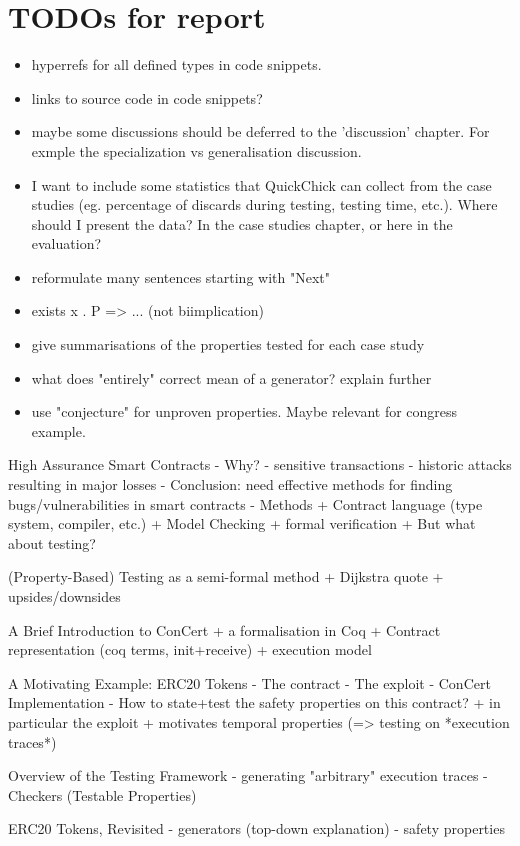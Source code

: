 \documentclass{article}
\begin{document}
\section{TODOs for report}
\begin{itemize}
    \item hyperrefs for all defined types in code snippets.
    \item links to source code in code snippets?
    \item maybe some discussions should be deferred to the 'discussion' chapter. For exmple the specialization vs generalisation discussion.
    \item I want to include some statistics that QuickChick can collect from the case studies (eg. percentage of discards during testing, testing time, etc.). Where should I present the data? In the case studies chapter, or here in the evaluation?
    \item reformulate many sentences starting with "Next"
    \item exists x . P => ... (not biimplication)
    \item give summarisations of the properties tested for each case study
    \item what does "entirely" correct mean of a generator? explain further
    \item use "conjecture" for unproven properties. Maybe relevant for congress example.
\end{itemize}

High Assurance Smart Contracts
- Why?
  - sensitive transactions
  - historic attacks resulting in major losses
  - Conclusion: need effective methods for finding bugs/vulnerabilities in smart contracts
- Methods
  + Contract language (type system, compiler, etc.)
  + Model Checking
  + formal verification
  + But what about testing?

(Property-Based) Testing as a semi-formal method
+ Dijkstra quote 
+ upsides/downsides

A Brief Introduction to ConCert
+ a formalisation in Coq
+ Contract representation (coq terms, init+receive)
+ execution model

A Motivating Example: ERC20 Tokens
- The contract
- The exploit
- ConCert Implementation
- How to state+test the safety properties on this contract?
  + in particular the exploit
  + motivates temporal properties (=> testing on *execution traces*)

Overview of the Testing Framework 
- generating "arbitrary" execution traces
- Checkers (Testable Properties)

ERC20 Tokens, Revisited
- generators (top-down explanation)
- safety properties



	
\end{document}
